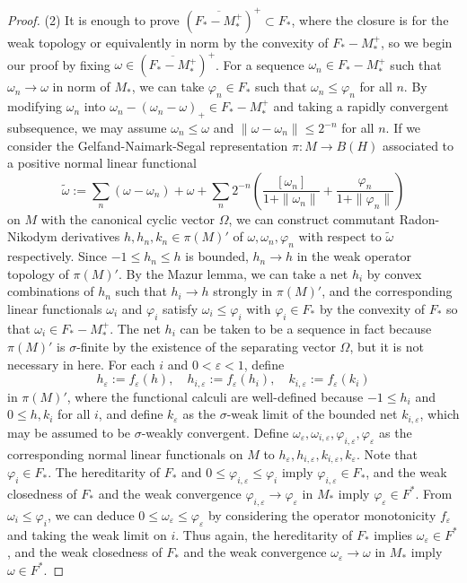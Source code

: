 \documentclass[a4paper]{amsart}
\newcommand{\e}{\varepsilon}
\theoremstyle{plain}
\theoremstyle{definition}
\begin{document}
\begin{proof}
(2)
It is enough to prove $(\overline{F_*-M_*^+})^+\subset F_*$, where the closure is for the weak topology or equivalently in norm by the convexity of $F_*-M_*^+$, so we begin our proof by fixing $\omega\in(\overline{F_*-M_*^+})^+$.
For a sequence $\omega_n\in F_*-M_*^+$ such that $\omega_n\to\omega$ in norm of $M_*$, we can take $\varphi_n\in F_*$ such that $\omega_n\le\varphi_n$ for all $n$.
By modifying $\omega_n$ into $\omega_n-(\omega_n-\omega)_+\in F_*-M_*^+$ and taking a rapidly convergent subsequence, we may assume $\omega_n\le\omega$ and $\|\omega-\omega_n\|\le2^{-n}$ for all $n$.
If we consider the Gelfand-Naimark-Segal representation $\pi:M\to B(H)$ associated to a positive normal linear functional \[\widetilde\omega:=\sum_n(\omega-\omega_n)+\omega+\sum_n2^{-n}\left(\frac{[\omega_n]}{1+\|\omega_n\|}+\frac{\varphi_n}{1+\|\varphi_n\|}\right)\]
on $M$ with the canonical cyclic vector $\Omega$, we can construct commutant Radon-Nikodym derivatives $h,h_n,k_n\in\pi(M)'$ of $\omega,\omega_n,\varphi_n$ with respect to $\widetilde\omega$ respectively.
Since $-1\le h_n\le h$ is bounded, $h_n\to h$ in the weak operator topology of $\pi(M)'$.
By the Mazur lemma, we can take a net $h_i$ by convex combinations of $h_n$ such that $h_i\to h$ strongly in $\pi(M)'$, and the corresponding linear functionals $\omega_i$ and $\varphi_i$ satisfy $\omega_i\le\varphi_i$ with $\varphi_i\in F_*$ by the convexity of $F_*$ so that $\omega_i\in F_*-M_*^+$.
The net $h_i$ can be taken to be a sequence in fact because $\pi(M)'$ is $\sigma$-finite by the existence of the separating vector $\Omega$, but it is not necessary in here.
For each $i$ and $0<\e<1$, define
\[h_\e:=f_\e(h),\quad h_{i,\e}:=f_\e(h_i),\quad k_{i,\e}:=f_\e(k_i)\]
in $\pi(M)'$, where the functional calculi are well-defined because $-1\le h_i$ and $0\le h,k_i$ for all $i$, and define $k_\e$ as the $\sigma$-weak limit of the bounded net $k_{i,\e}$, which may be assumed to be $\sigma$-weakly convergent.
Define $\omega_\e,\omega_{i,\e},\varphi_{i,\e},\varphi_\e$ as the corresponding normal linear functionals on $M$ to $h_\e,h_{i,\e},k_{i,\e},k_\e$.
Note that $\varphi_i\in F_*$.
The hereditarity of $F_*$ and $0\le\varphi_{i,\e}\le\varphi_i$ imply $\varphi_{i,\e}\in F_*$, and the weak closedness of $F_*$ and the weak convergence $\varphi_{i,\e}\to\varphi_\e$ in $M_*$ imply $\varphi_\e\in F^*$.
From $\omega_i\le\varphi_i$, we can deduce $0\le\omega_\e\le\varphi_\e$ by considering the operator monotonicity $f_\e$ and taking the weak limit on $i$.
Thus again, the hereditarity of $F_*$ implies $\omega_\e\in F^*$, and the weak closedness of $F_*$ and the weak convergence $\omega_\e\to\omega$ in $M_*$ imply $\omega\in F^*$.
\end{proof}
\end{document}
